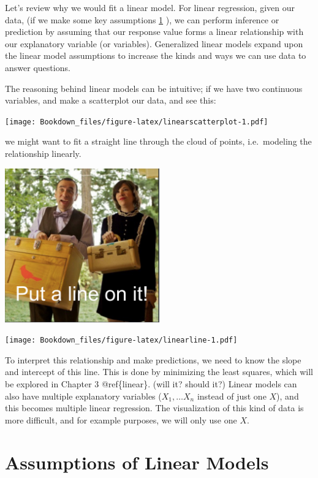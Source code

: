 \documentclass[
]{book}
\begin{document}
Let's review why we would fit a linear model. For linear regression, given our data, (if we make some key assumptions \ref{linear-assumptions} ), we can perform inference or prediction by assuming that our response value forms a linear relationship with our explanatory variable (or variables). Generalized linear models expand upon the linear model assumptions to increase the kinds and ways we can use data to answer questions.

The reasoning behind linear models can be intuitive; if we have two continuous variables, and make a scatterplot our data, and see this:

\texttt{[image: Bookdown\_files/figure-latex/linearscatterplot-1.pdf]}

we might want to fit a straight line through the cloud of points, i.e.~modeling the relationship linearly.

\includegraphics[width=0.5\textwidth,height=\textheight]{images/put_a_bird.png}

\texttt{[image: Bookdown\_files/figure-latex/linearline-1.pdf]}

To interpret this relationship and make predictions, we need to know the slope and intercept of this line. This is done by minimizing the least squares, which will be explored in Chapter 3 @ref\{linear\}. (will it? should it?) Linear models can also have multiple explanatory variables (\(X_1, \ldots X_n\) instead of just one \(X\)), and this becomes multiple linear regression. The visualization of this kind of data is more difficult, and for example purposes, we will only use one \(X\).

\hypertarget{linear-assumptions}{%
\section{Assumptions of Linear Models}\label{linear-assumptions}}
\end{document}
